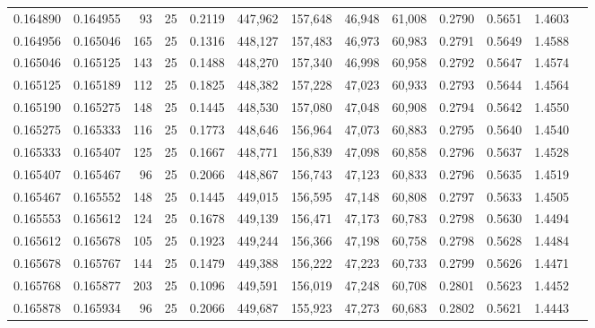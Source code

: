 \begin{tabular}{rrrrrrrrrrrrr}
0.164890 & 0.164955 &    93 &  25 &                                     0.2119 & 447,962 & 157,648 &  46,948 &  61,008 & 0.2790 & 0.5651 & 1.4603 \\
0.164956 & 0.165046 &   165 &  25 &                                     0.1316 & 448,127 & 157,483 &  46,973 &  60,983 & 0.2791 & 0.5649 & 1.4588 \\
0.165046 & 0.165125 &   143 &  25 &                                     0.1488 & 448,270 & 157,340 &  46,998 &  60,958 & 0.2792 & 0.5647 & 1.4574 \\
0.165125 & 0.165189 &   112 &  25 &                                     0.1825 & 448,382 & 157,228 &  47,023 &  60,933 & 0.2793 & 0.5644 & 1.4564 \\
0.165190 & 0.165275 &   148 &  25 &                                     0.1445 & 448,530 & 157,080 &  47,048 &  60,908 & 0.2794 & 0.5642 & 1.4550 \\
0.165275 & 0.165333 &   116 &  25 &                                     0.1773 & 448,646 & 156,964 &  47,073 &  60,883 & 0.2795 & 0.5640 & 1.4540 \\
0.165333 & 0.165407 &   125 &  25 &                                     0.1667 & 448,771 & 156,839 &  47,098 &  60,858 & 0.2796 & 0.5637 & 1.4528 \\
0.165407 & 0.165467 &    96 &  25 &                                     0.2066 & 448,867 & 156,743 &  47,123 &  60,833 & 0.2796 & 0.5635 & 1.4519 \\
0.165467 & 0.165552 &   148 &  25 &                                     0.1445 & 449,015 & 156,595 &  47,148 &  60,808 & 0.2797 & 0.5633 & 1.4505 \\
0.165553 & 0.165612 &   124 &  25 &                                     0.1678 & 449,139 & 156,471 &  47,173 &  60,783 & 0.2798 & 0.5630 & 1.4494 \\
0.165612 & 0.165678 &   105 &  25 &                                     0.1923 & 449,244 & 156,366 &  47,198 &  60,758 & 0.2798 & 0.5628 & 1.4484 \\
0.165678 & 0.165767 &   144 &  25 &                                     0.1479 & 449,388 & 156,222 &  47,223 &  60,733 & 0.2799 & 0.5626 & 1.4471 \\
0.165768 & 0.165877 &   203 &  25 &                                     0.1096 & 449,591 & 156,019 &  47,248 &  60,708 & 0.2801 & 0.5623 & 1.4452 \\
0.165878 & 0.165934 &    96 &  25 &                                     0.2066 & 449,687 & 155,923 &  47,273 &  60,683 & 0.2802 & 0.5621 & 1.4443 \\

\end{tabular}
